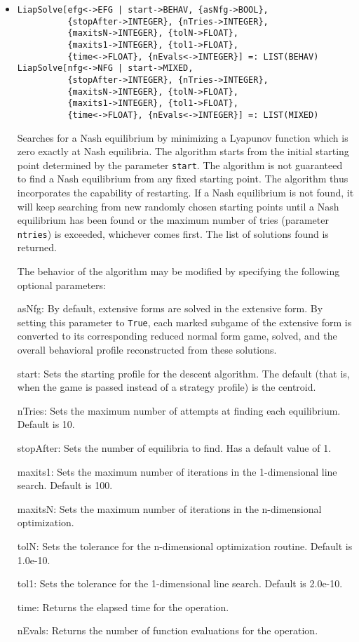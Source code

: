 \begin{itemize}
\item
\protect \large \begin{verbatim}
LiapSolve[efg<->EFG | start->BEHAV, {asNfg->BOOL},
          {stopAfter->INTEGER}, {nTries->INTEGER},
          {maxitsN->INTEGER}, {tolN->FLOAT},
          {maxits1->INTEGER}, {tol1->FLOAT},
          {time<->FLOAT}, {nEvals<->INTEGER}] =: LIST(BEHAV)
LiapSolve[nfg<->NFG | start->MIXED, 
          {stopAfter->INTEGER}, {nTries->INTEGER},
          {maxitsN->INTEGER}, {tolN->FLOAT},
          {maxits1->INTEGER}, {tol1->FLOAT},
          {time<->FLOAT}, {nEvals<->INTEGER}] =: LIST(MIXED)
\end{verbatim}\normalsize


\bd Searches for a Nash equilibrium by minimizing a Lyapunov function
which is zero exactly at Nash equilibria.  The algorithm starts from
the initial starting point determined by the parameter \verb+start+.
The algorithm is not guaranteed to find a Nash equilibrium from any
fixed starting point.  The algorithm thus incorporates the capability
of restarting.  If a Nash equilibrium is not found, it will keep
searching from new randomly chosen starting points until a Nash
equilibrium has been found or the maximum number of tries (parameter
\verb+ntries+) is exceeded, whichever comes first.  The list of
solutions found is returned.

The behavior of the algorithm may be modified by specifying the following
optional parameters:
\bd
\item
[asNfg:] By default, extensive forms are solved in the extensive form.
By setting this parameter to \verb+True+, each marked subgame of the
extensive form is converted to its corresponding reduced normal form game,
solved, and the overall behavioral profile reconstructed from these
solutions.
\item
[start:] Sets the starting profile for the descent algorithm.  The
default (that is, when the game is passed instead of a strategy
profile) is the centroid.
\item
[nTries:] Sets the maximum number of attempts at finding each
equilibrium. Default is 10.
\item
[stopAfter:] Sets the number of equilibria to find.  Has a default
value of 1.  
\item
[maxits1:] Sets the maximum number of iterations in the
1-dimensional line search.  Default is 100.
\item
[maxitsN:] Sets the maximum number of iterations in the
n-dimensional optimization.  
\item
[tolN:] Sets the tolerance for the n-dimensional optimization
routine.  Default is 1.0e-10.
\item
[tol1:] Sets the tolerance for the 1-dimensional line search.
Default is 2.0e-10.
\item
[time:] Returns the elapsed time for the operation.
\item
[nEvals:] Returns the number of function evaluations for the operation.
\ed


\end{itemize}

